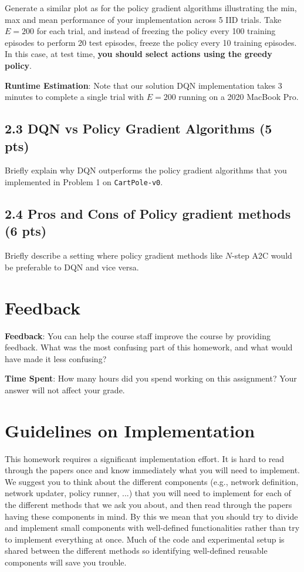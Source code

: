\documentclass[12pt]{article}
\begin{document}
Generate a similar plot as for the policy gradient algorithms illustrating the min, max and mean performance of your implementation across 5 IID trials. Take $E=200$ for each trial, and instead of freezing the policy every 100 training episodes to perform 20 test episodes, freeze the policy every 10 training episodes. In this case, at test time, \textbf{you should select actions using the greedy policy}.

\textbf{Runtime Estimation}: Note that our solution DQN implementation takes 3 minutes to complete a single trial with $E=200$ running on a 2020 MacBook Pro.


\subsection*{2.3 DQN vs Policy Gradient Algorithms (5 pts)}
Briefly explain why DQN outperforms the policy gradient algorithms that you implemented in Problem 1 on \texttt{CartPole-v0}.

\subsection*{2.4 Pros and Cons of Policy gradient methods (6 pts)}
Briefly describe a setting where policy gradient methods like $N$-step A2C would be preferable to DQN and vice versa.

\newpage
\section*{Feedback}

\textbf{Feedback}: You can help the course staff improve the course by providing feedback. 
What was the most confusing part of this homework, and what would have made it less confusing?

\vspace{2em}
\noindent\textbf{Time Spent}: How many hours did you spend working on this assignment? Your answer will not affect your grade.

\newpage

\section*{Guidelines on Implementation}
\label{sec:guidelines}
This homework requires a significant implementation effort. It is hard to read through the papers once and know immediately what you will need to implement. We suggest you to think about the different components (e.g., network definition, network updater, policy runner, ...) that you will need to implement for each of the different methods that we ask you about, and then read through the papers having these components in mind. By this we mean that you should try to divide and implement small components with well-defined functionalities rather than try to implement everything at once. Much of the code and experimental setup is shared between the different methods so identifying well-defined reusable components will save you trouble.
\end{document}
